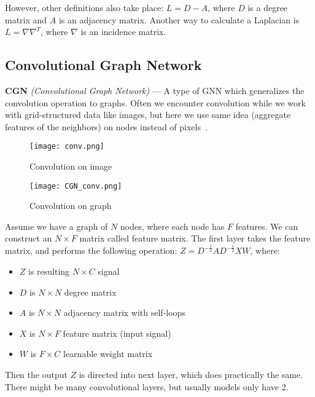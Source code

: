     However, other definitions also take place: $L = D - A$, where $D$ is a degree matrix and $A$ is an adjacency matrix.
    Another way to calculate a Laplacian is $L = \nabla\nabla^{T}$, where $\nabla$ is an incidence matrix.


\subsection*{Convolutional Graph Network}

    \textbf{CGN} \textit{(Convolutional Graph Network)} --- A type of GNN which generalizes the convolution operation to graphs.
    Often we encounter convolution while we work with grid-structured data like images, but here we use same idea (aggregate features of the neighbors) on nodes instead of pixels~\cite{9046288}.

    \begin{figure}[h]
        \begin{multicols}{2}
            \centering
            \texttt{[image: conv.png]}
            \caption{Convolution on image}
        
            \centering
            \texttt{[image: CGN\_conv.png]}
            \caption{Convolution on graph}
        \end{multicols}
    \end{figure}

    Assume we have a graph of $N$ nodes, where each node has $F$ features.
    We can construct an $N \times F$ matrix called feature matrix.
    The first layer takes the feature matrix, and performs the following operation: $Z = D^{-\frac{1}{2}} A D^{-\frac{1}{2}} X W$, where: 
    \begin{itemize}
        \item $Z$ is resulting $N \times C$ signal
        \item $D$ is $N \times N$ degree matrix
        \item $A$ is $N \times N$ adjacency matrix with self-loops
        \item $X$ is $N \times F$ feature matrix (input signal)
        \item $W$ is $F \times C$ learnable weight matrix
    \end{itemize}

    Then the output $Z$ is directed into next layer, which does practically the same.
    There might be many convolutional layers, but usually models only have 2.

